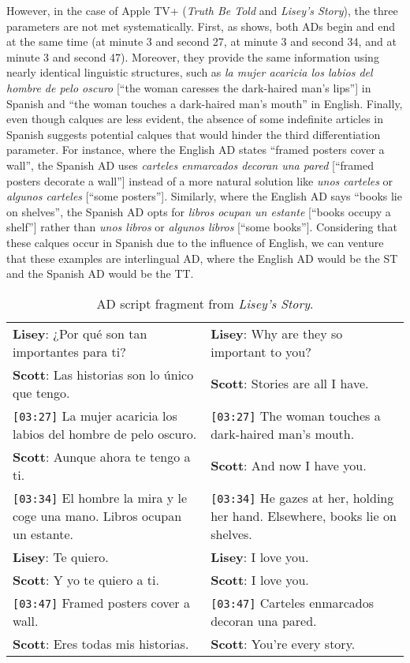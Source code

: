 \documentclass[english]{textolivre}
\begin{document}
However, in the case of Apple TV+ (\textit{Truth Be Told} and \textit{Lisey’s Story}), the three parameters are not met systematically. First, as  shows, both ADs begin and end at the same time (at minute 3 and second 27, at minute 3 and second 34, and at minute 3 and second 47). Moreover, they provide the same information using nearly identical linguistic structures, such as \textit{la mujer acaricia los labios del hombre de pelo oscuro} [“the woman caresses the dark-haired man’s lips”] in Spanish and “the woman touches a dark-haired man’s mouth” in English. Finally, even though calques are less evident, the absence of some indefinite articles in Spanish suggests potential calques that would hinder the third differentiation parameter. For instance, where the English AD states “framed posters cover a wall”, the Spanish AD uses \textit{carteles enmarcados decoran una pared} [“framed posters decorate a wall”] instead of a more natural solution like  \textit{unos carteles} or \textit{algunos carteles} [“some posters”]. Similarly, where the English AD says “books lie on shelves”, the Spanish AD opts for \textit{libros ocupan un estante} [“books occupy a shelf”] rather than \textit{unos libros} or \textit{algunos libros} [“some books”]. Considering that these calques occur in Spanish due to the influence of English, we can venture that these examples are interlingual AD, where the English AD would be the ST and the Spanish AD would be the TT.

\begin{table}[htbp]
\centering
\begin{threeparttable}
\caption{AD script fragment from \textit{Lisey’s Story}.}
\label{tbl5}
\begin{tabular}{p{7cm} p{7cm}}
\toprule
\textbf{Lisey}: ¿Por qué son tan importantes para ti? & \textbf{Lisey}: Why are they so important to you?   \\ 
\textbf{Scott}: Las historias son lo único que tengo. & \textbf{Scott}: Stories are all I have.  \\
\texttt{[03:27]} La mujer acaricia los labios del hombre de pelo oscuro. & \texttt{[03:27]} The woman touches a dark-haired man’s mouth. \\
\textbf{Scott}: Aunque ahora te tengo a ti. & \textbf{Scott}: And now I have you. \\
\texttt{[03:34]} El hombre la mira y le coge una mano. Libros ocupan un estante. & \texttt{[03:34]} He gazes at her, holding her hand. Elsewhere, books lie on shelves. \\
\textbf{Lisey}: Te quiero. & \textbf{Lisey}: I love you. \\
\textbf{Scott}: Y yo te quiero a ti. & \textbf{Scott}: I love you. \\
\texttt{[03:47]} Framed posters cover a wall. & \texttt{[03:47]} Carteles enmarcados decoran una pared. \\
\textbf{Scott}: Eres todas mis historias. & \textbf{Scott}: You’re every story. \\
\bottomrule
\end{tabular}
\end{threeparttable}
\end{table}
\end{document}
